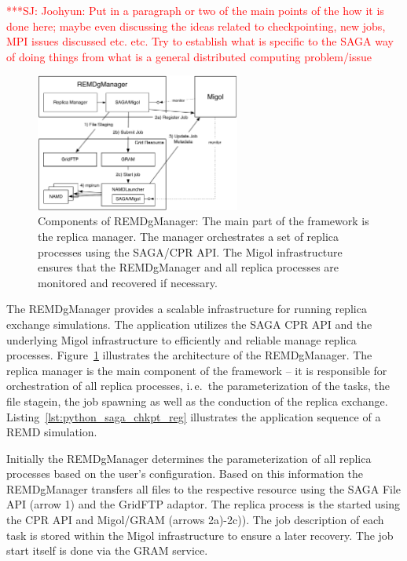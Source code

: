 \documentclass[times, 10pt,twocolumn]{article}
\newcommand{\jhanote}[1]{ {\textcolor{red} { ***SJ: #1 }}}
\begin{document}

\jhanote{Joohyun: Put in a paragraph or two of the main points of the
  how it is done here; maybe even discussing the ideas related to
  checkpointing, new jobs, MPI issues discussed etc. etc. Try to
  establish what is specific to the SAGA way of doing things from what
  is a general distributed computing problem/issue}

\begin{figure}[htbp]
      \centering
          \includegraphics[width=0.6\textwidth]{REMDgManager-architecture.pdf}
      \caption{Components of REMDgManager: The main part of the framework is the replica manager. The manager orchestrates a set of replica processes using the SAGA/CPR API. The Migol infrastructure ensures that the REMDgManager and all replica processes are monitored and recovered if necessary.}
      \label{fig:REMDgManager-architecture}
\end{figure}

                                  
The REMDgManager provides a scalable infrastructure for running replica exchange simulations. The application utilizes the SAGA CPR API and the underlying Migol infrastructure to efficiently and reliable manage replica processes. Figure~\ref{fig:REMDgManager-architecture} illustrates the architecture of the REMDgManager. The replica manager is the main component of the framework -- it is responsible for orchestration of all replica processes, i.\,e.\ the parameterization of the tasks, the file stagein, the job spawning as well as the conduction of the replica exchange. Listing~\ref{lst:python_saga_chkpt_reg} illustrates the application sequence of a REMD simulation.
                                    
Initially the REMDgManager determines the parameterization of all replica processes based on the user's configuration. Based on this information the REMDgManager transfers all files to the respective resource using the SAGA File API (arrow 1) and the GridFTP adaptor. The replica process is the started using the CPR API and Migol/GRAM (arrows 2a)-2c)). The job description of each task is stored within the Migol infrastructure to ensure a later recovery. The job start itself is done via the GRAM service. 
    
\end{document}

